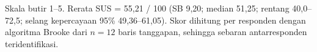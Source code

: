 \noindent\tabnotestyle Skala butir 1--5. Rerata SUS = 55,21 / 100 (SB 9,20; median 51,25; rentang 40,0--72,5; selang kepercayaan 95\% 49,36--61,05). Skor dihitung per responden dengan algoritma Brooke dari $n = 12$ baris tanggapan, sehingga sebaran antarresponden teridentifikasi.\normalsize

\endgroup

